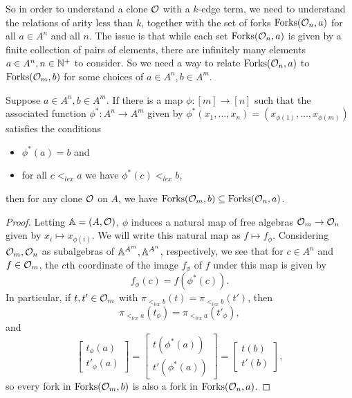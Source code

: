 \documentclass[letterpaper,11pt]{article}
\DeclareMathOperator{\Forks}{Forks}
\begin{document}
So in order to understand a clone $\mathcal{O}$ with a $k$-edge term, we need to understand the relations of arity less than $k$, together with the set of forks $\Forks(\cO_n,a)$ for all $a \in A^n$ and all $n$. The issue is that while each set $\Forks(\cO_n,a)$ is given by a finite collection of pairs of elements, there are infinitely many elements $a \in A^n, n \in \mathbb{N}^+$ to consider. So we need a way to relate $\Forks(\cO_n,a)$ to $\Forks(\cO_m,b)$ for some choices of $a \in A^n, b \in A^m$.

\begin{prop} Suppose $a \in A^n, b \in A^m$. If there is a map $\phi : [m] \rightarrow [n]$ such that the associated function $\phi^* : A^n \rightarrow A^m$ given by $\phi^*(x_1, ..., x_n) = (x_{\phi(1)}, ..., x_{\phi(m)})$ satisfies the conditions
\begin{itemize}
\item $\phi^*(a) = b$ and
\item for all $c <_{lex} a$ we have $\phi^*(c) <_{lex} b$,
\end{itemize}
then for any clone $\mathcal{O}$ on $A$, we have $\Forks(\cO_m,b) \subseteq \Forks(\cO_n,a)$.
\end{prop}
\begin{proof} Letting $\mathbb{A} = (A,\mathcal{O})$, $\phi$ induces a natural map of free algebras $\mathcal{O}_m \rightarrow \mathcal{O}_n$ given by $x_i \mapsto x_{\phi(i)}$. We will write this natural map as $f \mapsto f_\phi$. Considering $\mathcal{O}_m, \mathcal{O}_n$ as subalgebras of $\mathbb{A}^{A^m}, \mathbb{A}^{A^n}$, respectively, we see that for $c \in A^n$ and $f \in \mathcal{O}_m$, the $c$th coordinate of the image $f_\phi$ of $f$ under this map is given by
\[
f_\phi(c) = f(\phi^*(c)).
\]
In particular, if $t, t' \in \mathcal{O}_m$ with $\pi_{<_{lex} b}(t) = \pi_{<_{lex} b}(t')$, then
\[
\pi_{<_{lex} a}(t_\phi) = \pi_{<_{lex} a}(t'_\phi),
\]
and
\[
\begin{bmatrix} t_\phi(a)\\ t'_\phi(a)\end{bmatrix} = \begin{bmatrix} t(\phi^*(a))\\ t'(\phi^*(a))\end{bmatrix} = \begin{bmatrix} t(b)\\ t'(b)\end{bmatrix},
\]
so every fork in $\Forks(\cO_m,b)$ is also a fork in $\Forks(\cO_n,a)$.
\end{proof}
\end{document}
